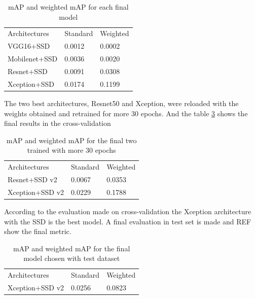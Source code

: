 \documentclass[11pt, a4paper, twocolumn]{article}
\begin{document}
\begin{table}[!ht]
	\begin{tabular}{lll}
		\rowcolor[HTML]{EFEFEF} 
		Architectures & Standard & Weighted \\
		VGG16+SSD     & 0.0012 & 0.0002   \\
		\rowcolor[HTML]{EFEFEF} 
		Mobilenet+SSD & 0.0036 & 0.0020   \\
		\rowcolor[HTML]{FFFFFF} 
		Resnet+SSD    & 0.0091 & 0.0308   \\
		\rowcolor[HTML]{EFEFEF} 
		Xception+SSD  & 0.0174 & 0.1199  
	\end{tabular}
	\caption{mAP and weighted mAP for each final model}
	\label{table:crossvaltable}
\end{table}

The two best architectures, Resnet50 and Xception, were reloaded with the weights obtained and retrained for more 30 epochs. And the table \ref{table:finalchosenmodel} shows the final results in the cross-validation

\begin{table}[!ht]
	\begin{tabular}{lll}
		\rowcolor[HTML]{EFEFEF} 
		Architectures & Standard & Weighted \\
		Resnet+SSD v2 & 0.0067 & 0.0353   \\
		\rowcolor[HTML]{EFEFEF} 
		Xception+SSD v2 & 0.0229 & 0.1788
	\end{tabular}
	\caption{mAP and weighted mAP for the final two trained with more 30 epochs}
	\label{table:finalchosenmodel}
\end{table}

According to the evaluation made on cross-validation the Xception architecture with the SSD is the best model. A final evaluation in test set is made and REF show the final metric.

\begin{table}[!ht]
	\begin{tabular}{lll}
		\rowcolor[HTML]{EFEFEF} 
		Architectures & Standard & Weighted \\
		Xception+SSD v2 & 0.0256 & 0.0823
	\end{tabular}
	\caption{mAP and weighted mAP for the final model chosen with test dataset}
	\label{table:finalchosenmodel}
\end{table}
\end{document}
